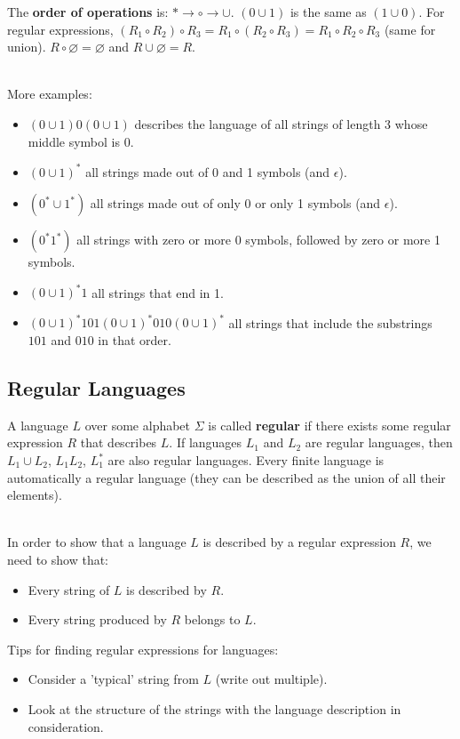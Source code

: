 \documentclass[12pt]{article}
\begin{document}
\newpage
\noindent
The \textbf{order of operations} is: $* \rightarrow \circ \rightarrow \cup$.
$(0 \cup 1)$ is the same as $(1 \cup 0)$.
For regular expressions, $(R_1 \circ R_2) \circ R_3 = R_1 \circ (R_2 \circ R_3) = R_1 \circ R_2 \circ R_3$ (same for union).
$R \circ \varnothing = \varnothing$ and $R \cup \varnothing = R$.

\noindent
\\
More examples:
\begin{itemize}
    \item $(0 \cup 1)0(0 \cup 1)$ describes the language of all strings of length 3 whose middle symbol is 0.
    \item $(0 \cup 1)^*$ all strings made out of 0 and 1 symbols (and $\epsilon$).
    \item $(0^* \cup 1^*)$ all strings made out of only 0 or only 1 symbols (and $\epsilon$).
    \item $(0^*1^*)$ all strings with zero or more 0 symbols, followed by zero or more 1 symbols.
    \item $(0 \cup 1)^*1$ all strings that end in 1.
    \item $(0 \cup 1)^*101(0 \cup 1)^*010(0 \cup 1)^*$ all strings that include the substrings $101$ and $010$ in that order.
\end{itemize}

\subsection*{Regular Languages}
A language $L$ over some alphabet $\Sigma$ is called \textbf{regular} if there exists some regular expression $R$ that describes $L$.
If languages $L_1$ and $L_2$ are regular languages, then $L_1 \cup L_2$, $L_1 L_2$, $L_1^*$ are also regular languages.
Every finite language is automatically a regular language (they can be described as the union of all their elements).

\noindent
\\
In order to show that a language $L$ is described by a regular expression $R$, we need to show that:
\begin{itemize}
    \item Every string of $L$ is described by $R$.
    \item Every string produced by $R$ belongs to $L$.
\end{itemize}

\noindent
Tips for finding regular expressions for languages:
\begin{itemize}
    \item Consider a 'typical' string from $L$ (write out multiple).
    \item Look at the structure of the strings with the language description in consideration.
\end{itemize}
\end{document}

